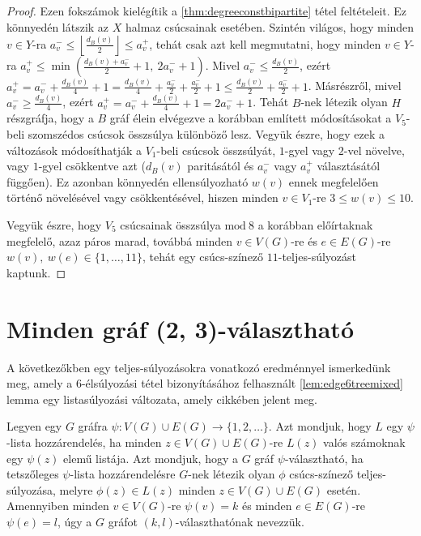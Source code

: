 \documentclass[12pt, a4paper]{report}
\theoremstyle{remark}
\theoremstyle{definition}
\begin{document}
\begin{proof}
Ezen fokszámok kielégítik a \ref{thm:degreeconstbipartite} tétel feltételeit. Ez könnyedén látszik az $X$ halmaz csúcsainak esetében. Szintén világos, hogy minden $v \in Y$-ra $a_v^- \leq \left\lfloor \frac{d_B(v)}{2} \right\rfloor \leq a_v^+$, tehát csak azt kell megmutatni, hogy minden $v \in Y$-ra $a_v^+ \leq \min \left( \frac{d_B(v) + a_v^-}{2} + 1,\ 2a_v^- + 1 \right)$. Mivel $a_v^- \leq \frac{d_B(v)}{2}$, ezért $a_v^+ = a_v^- + \frac{d_B(v)}{4} + 1 = \frac{d_B(v)}{4} + \frac{a_v^-}{2} + \frac{a_v^-}{2} + 1 \leq \frac{d_B(v)}{2} + \frac{a_v^-}{2} + 1$. Másrészről, mivel $a_v^- \geq \frac{d_B(v)}{4}$, ezért $a_v^+ = a_v^- + \frac{d_B(v)}{4} + 1 = 2a_v^- + 1$. Tehát $B$-nek létezik olyan $H$ részgráfja, hogy a $B$ gráf élein elvégezve a korábban említett módosításokat a $V_5$-beli szomszédos csúcsok összsúlya különböző lesz. Vegyük észre, hogy ezek a változások módosíthatják a $V_1$-beli csúcsok összsúlyát, $1$-gyel vagy $2$-vel növelve, vagy $1$-gyel csökkentve azt ($d_B(v)$ paritásától és $a_v^-$ vagy $a_v^+$ választásától függően). Ez azonban könnyedén ellensúlyozható $w(v)$ ennek megfelelően történő növelésével vagy csökkentésével, hiszen minden $v \in V_1$-re $3 \leq w(v) \leq 10$.

Vegyük észre, hogy $V_5$ csúcsainak összsúlya $\mathrm{mod}\ 8$ a korábban előírtaknak megfelelő, azaz páros marad, továbbá minden $v \in V(G)$-re és $e \in E(G)$-re $w(v),\ w(e) \in \lbrace 1, \ldots, 11 \rbrace$, tehát egy csúcs-színező $11$-teljes-súlyozást kaptunk.
\end{proof}

\section{Minden gráf (2, 3)-választható}
A következőkben egy teljes-súlyozásokra vonatkozó eredménnyel ismerkedünk meg, amely a $6$-élsúlyozási tétel bizonyításához felhasznált \ref{lem:edge6treemixed} lemma egy listasúlyozási változata, amely \citeauthor{Wong2014} \cite{Wong2014} cikkében jelent meg. 

Legyen egy $G$ gráfra $\psi: V(G) \cup E(G) \rightarrow \lbrace 1, 2, \ldots \rbrace$. Azt mondjuk, hogy $L$ egy $\psi$-lista hozzárendelés, ha minden $z \in V(G) \cup E(G)$-re $L(z)$ valós számoknak egy $\psi(z)$ elemű listája. Azt mondjuk, hogy a $G$ gráf $\psi$-választható, ha tetszőleges $\psi$-lista hozzárendelésre $G$-nek létezik olyan $\phi$ csúcs-színező teljes-súlyozása, melyre $\phi(z) \in L(z)$ minden $z \in V(G) \cup E(G)$ esetén. Amennyiben minden $v \in V(G)$-re $\psi(v) = k$ és minden $e \in E(G)$-re $\psi(e) = l$, úgy a $G$ gráfot $(k, l)$-választhatónak nevezzük. 
\end{document}
